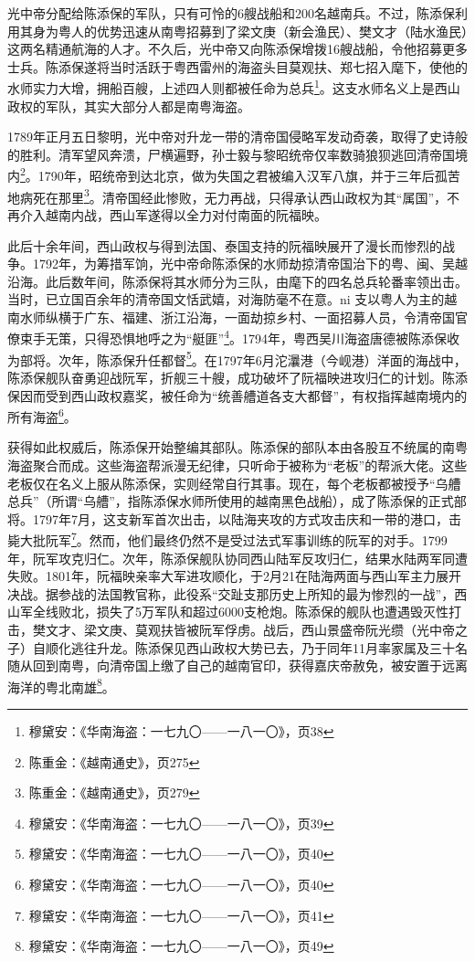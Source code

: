 光中帝分配给陈添保的军队，只有可怜的6艘战船和200名越南兵。不过，陈添保利用其身为粤人的优势迅速从南粤招募到了梁文庚（新会渔民）、樊文才（陆水渔民）这两名精通航海的人才。不久后，光中帝又向陈添保增拨16艘战船，令他招募更多士兵。陈添保遂将当时活跃于粤西雷州的海盗头目莫观扶、郑七招入麾下，使他的水师实力大增，拥船百艘，上述四人则都被任命为总兵\footnote{穆黛安：《华南海盗：一七九〇——一八一〇》，页38}。这支水师名义上是西山政权的军队，其实大部分人都是南粤海盗。

1789年正月五日黎明，光中帝对升龙一带的清帝国侵略军发动奇袭，取得了史诗般的胜利。清军望风奔溃，尸横遍野，孙士毅与黎昭统帝仅率数骑狼狈逃回清帝国境内\footnote{陈重金：《越南通史》，页275}。1790年，昭统帝到达北京，做为失国之君被编入汉军八旗，并于三年后孤苦地病死在那里\footnote{陈重金：《越南通史》，页279}。清帝国经此惨败，无力再战，只得承认西山政权为其“属国”，不再介入越南内战，西山军遂得以全力对付南面的阮福映。

此后十余年间，西山政权与得到法国、泰国支持的阮福映展开了漫长而惨烈的战争。1792年，为筹措军饷，光中帝命陈添保的水师劫掠清帝国治下的粤、闽、吴越沿海。此后数年间，陈添保将其水师分为三队，由麾下的四名总兵轮番率领出击。当时，已立国百余年的清帝国文恬武嬉，对海防毫不在意。ni 支以粤人为主的越南水师纵横于广东、福建、浙江沿海，一面劫掠乡村、一面招募人员，令清帝国官僚束手无策，只得恐惧地呼之为“艇匪”\footnote{穆黛安：《华南海盗：一七九〇——一八一〇》，页39 }。1794年，粤西吴川海盗唐德被陈添保收为部将。次年，陈添保升任都督\footnote{穆黛安：《华南海盗：一七九〇——一八一〇》，页40}。在1797年6月沱㶞港（今岘港）洋面的海战中，陈添保舰队奋勇迎战阮军，折舰三十艘，成功破坏了阮福映进攻归仁的计划。陈添保因而受到西山政权嘉奖，被任命为“统善艚道各支大都督”，有权指挥越南境内的所有海盗\footnote{穆黛安：《华南海盗：一七九〇——一八一〇》，页40}。

获得如此权威后，陈添保开始整编其部队。陈添保的部队本由各股互不统属的南粤海盗聚合而成。这些海盗帮派漫无纪律，只听命于被称为“老板”的帮派大佬。这些老板仅在名义上服从陈添保，实则经常自行其事。现在，每个老板都被授予“乌艚总兵”（所谓“乌艚”，指陈添保水师所使用的越南黑色战船），成了陈添保的正式部将。1797年7月，这支新军首次出击，以陆海夹攻的方式攻击庆和一带的港口，击毙大批阮军\footnote{穆黛安：《华南海盗：一七九〇——一八一〇》，页41}。然而，他们最终仍然不是受过法式军事训练的阮军的对手。1799年，阮军攻克归仁。次年，陈添保舰队协同西山陆军反攻归仁，结果水陆两军同遭失败。1801年，阮福映亲率大军进攻顺化，于2月21在陆海两面与西山军主力展开决战。据参战的法国教官称，此役系“交趾支那历史上所知的最为惨烈的一战”，西山军全线败北，损失了5万军队和超过6000支枪炮。陈添保的舰队也遭遇毁灭性打击，樊文才、梁文庚、莫观扶皆被阮军俘虏。战后，西山景盛帝阮光缵（光中帝之子）自顺化逃往升龙。陈添保见西山政权大势已去，乃于同年11月率家属及三十名随从回到南粤，向清帝国上缴了自己的越南官印，获得嘉庆帝赦免，被安置于远离海洋的粤北南雄\footnote{穆黛安：《华南海盗：一七九〇——一八一〇》，页49}。

